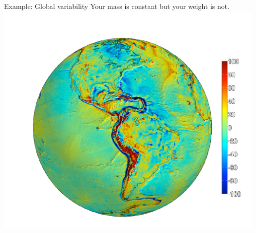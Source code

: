 \begin{frame}
  \begin{PointSix}{Example: Global variability}
  \centering
  \small Your mass is constant but your weight is not.
  \includegraphics[width=0.99\textwidth]{Figures/Gravity/Exported/Grace_JPLCaltect_FODT10_WithPeople.png}
  \end{PointSix}
\end{frame}


